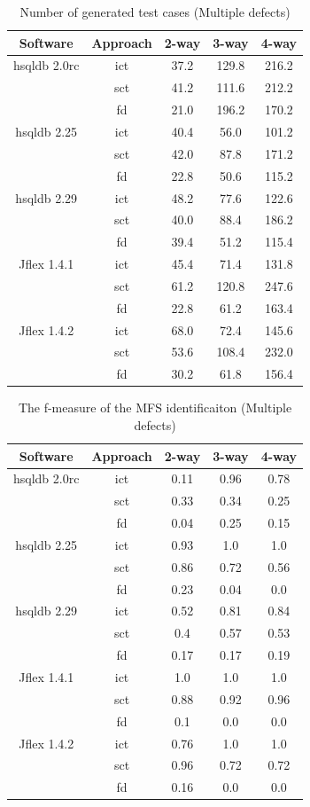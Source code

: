 \documentclass[10pt,journal,compsoc]{IEEEtran}
\begin{document}
{\begin{table}[ht]
\caption{Number of generated test cases (Multiple defects)}
\label{multiple_tdefects_tests}
\centering
\begin{tabular}{|c|c|c|c|c|} \hline
Software&  Approach &  2-way & 3-way & 4-way\\ \hline
hsqldb 2.0rc	&ict	&37.2	&129.8	&216.2	\\
	&sct	&41.2	&111.6	&212.2	\\
	&fd	&21.0	&196.2	&170.2	\\\hline
hsqldb 2.25	&ict	&40.4	&56.0	&101.2	\\
	&sct	&42.0	&87.8	&171.2	\\
	&fd	&22.8	&50.6	&115.2	\\\hline
hsqldb 2.29	&ict	&48.2	&77.6	&122.6	\\
	&sct	&40.0	&88.4	&186.2	\\
	&fd	&39.4	&51.2	&115.4	\\\hline
Jflex 1.4.1	&ict	&45.4	&71.4	&131.8	\\
	&sct	&61.2	&120.8	&247.6	\\
	&fd	&22.8	&61.2	&163.4	\\\hline
Jflex 1.4.2	&ict	&68.0	&72.4	&145.6	\\
	&sct	&53.6	&108.4	&232.0	\\
	&fd	&30.2	&61.8	&156.4	\\\hline
\end{tabular}
\end{table}

\begin{table}[ht]
\caption{The f-measure of the MFS identificaiton (Multiple defects)}
\label{multiple_tdefects_identification}
\centering
\begin{tabular}{|c|c|c|c|c|} \hline
Software&  Approach & 2-way & 3-way & 4-way\\ \hline
hsqldb 2.0rc	&ict	&0.11	&0.96	&0.78	\\
	&sct	&0.33	&0.34	&0.25	\\
	&fd	&0.04	&0.25	&0.15	\\  \hline
hsqldb 2.25	&ict	&0.93	&1.0	&1.0	\\
	&sct	&0.86	&0.72	&0.56	\\
	&fd	&0.23	&0.04	&0.0	\\  \hline
hsqldb 2.29	&ict	&0.52	&0.81	&0.84	\\
	&sct	&0.4	&0.57	&0.53	\\
	&fd	&0.17	&0.17	&0.19	\\  \hline
Jflex 1.4.1	&ict	&1.0	&1.0	&1.0	\\
	&sct	&0.88	&0.92	&0.96	\\
	&fd	&0.1	&0.0	&0.0	\\  \hline
Jflex 1.4.2	&ict	&0.76	&1.0	&1.0	\\
	&sct	&0.96	&0.72	&0.72	\\
	&fd	&0.16	&0.0	&0.0	\\  \hline
\end{tabular}
\end{table}



}
\end{document}
